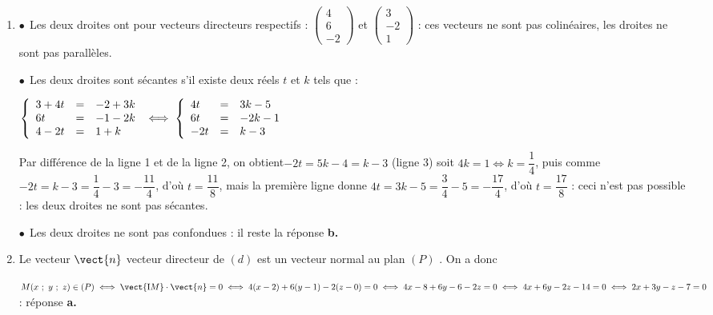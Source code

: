 \begin{enumerate}
Réponse \textbf{d}.
\item 













$\bullet~~$Les deux droites ont pour vecteurs directeurs respectifs : $\begin{pmatrix}4\\6\\-2\end{pmatrix}$ et $\begin{pmatrix}3\\-2\\1\end{pmatrix}$ : ces vecteurs ne sont pas colinéaires, les droites ne sont pas parallèles.

$\bullet~~$Les deux droites sont sécantes s'il existe deux réels $t$ et $k$ tels que :

$\left\{\begin{array}{l c l}
3 + 4t&=&- 2 + 3k\\
6t&=&- 1 - 2k\\
4 - 2t&=&1 + k
\end{array}\right. \iff \left\{\begin{array}{l c l}
4t&=&3k - 5\\6t&=&- 2k - 1\\
- 2t&=&k - 3\end{array}\right.$

Par différence de la ligne 1 et de la ligne 2, on obtient$ -2t = 5k - 4 = k - 3$ (ligne 3) soit $4k = 1 \iff k = \dfrac14$, puis comme $- 2t = k - 3 = \dfrac14 - 3 = - \dfrac{11}{4}$, d'où $t = \dfrac{11}{8}$, mais la première ligne donne $4t = 3k - 5 = \dfrac34 - 5 = - \dfrac{17}{4}$, d'où $t = \dfrac{17}{8}$ : ceci n'est pas possible : les deux droites ne sont pas sécantes.

$\bullet~~$Les deux droites ne sont pas confondues : il reste la réponse \textbf{b.}

\item  







Le vecteur $\vect{n}$ vecteur directeur de $(d)$ est un vecteur normal au plan $(P)$ . On a donc 

$M(x~;~y~;~z) \in (P) \iff \vect{\text{I}M} \cdot \vect{n} = 0 \iff 4(x - 2) + 6(y - 1) - 2(z - 0) = 0 \iff 4x - 8 + 6y - 6 - 2z = 0 \iff 4x + 6y -2z - 14 = 0 \iff 2x + 3y - z - 7 = 0$ : réponse \textbf{a.}
\end{enumerate}

\bigskip
